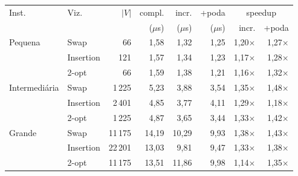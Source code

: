 \begin{tabular}{llrrrrrr}
\toprule
Inst. & Viz. & $|V|$ & compl. & incr. & +poda & \multicolumn{2}{c}{speedup} \\
 & & & ($\mu$s) & ($\mu$s) & ($\mu$s) & incr. & +poda \\
\midrule
Pequena & Swap & 66 & 1{,}58 & 1{,}32 & 1{,}25 & 1{,}20$\times$ & 1{,}27$\times$ \\
 & Insertion & 121 & 1{,}57 & 1{,}34 & 1{,}23 & 1{,}17$\times$ & 1{,}28$\times$ \\
 & 2-opt & 66 & 1{,}59 & 1{,}38 & 1{,}21 & 1{,}16$\times$ & 1{,}32$\times$ \\
\addlinespace
Intermediária & Swap & 1\,225 & 5{,}23 & 3{,}88 & 3{,}54 & 1{,}35$\times$ & 1{,}48$\times$ \\
 & Insertion & 2\,401 & 4{,}85 & 3{,}77 & 4{,}11 & 1{,}29$\times$ & 1{,}18$\times$ \\
 & 2-opt & 1\,225 & 4{,}87 & 3{,}65 & 3{,}44 & 1{,}33$\times$ & 1{,}42$\times$ \\
\addlinespace
Grande & Swap & 11\,175 & 14{,}19 & 10{,}29 & 9{,}93 & 1{,}38$\times$ & 1{,}43$\times$ \\
 & Insertion & 22\,201 & 13{,}03 & 9{,}81 & 9{,}47 & 1{,}33$\times$ & 1{,}38$\times$ \\
 & 2-opt & 11\,175 & 13{,}51 & 11{,}86 & 9{,}98 & 1{,}14$\times$ & 1{,}35$\times$ \\
\bottomrule
\end{tabular}
